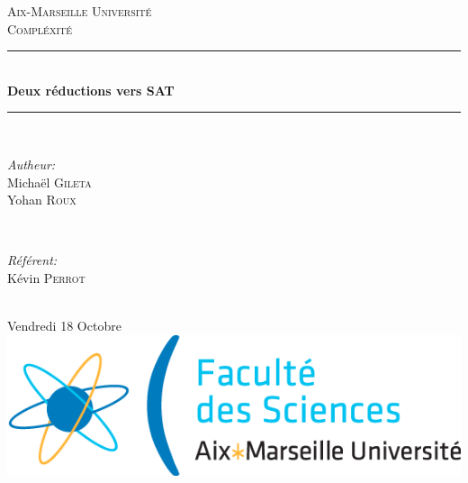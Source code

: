 \documentclass[12pt]{report}
\begin{document}
\begin{titlepage}
\vspace*{\fill}
\newcommand{\HRule}{\rule{\linewidth}{0.5mm}}

\center

\textsc{\LARGE Aix-Marseille Université}\\[1.5cm]
\textsc{\Large Compléxité}\\[0.5cm]

\HRule \\[0.4cm]
{ \huge \bfseries Deux réductions vers SAT}\\[0.4cm] %
\HRule \\[1.5cm]

\begin{minipage}{0.4\textwidth}
\begin{flushleft} \large
\emph{Autheur:}\\
Michaël \textsc{Gileta} \\
Yohan \textsc{Roux}
\end{flushleft}
\end{minipage}
~
\begin{minipage}{0.4\textwidth}
\begin{flushright} \large
\emph{Référent:} \\
Kévin \textsc{Perrot}
\end{flushright}
\end{minipage}\\[2cm]

{\large Vendredi 18 Octobre}\\[2cm]

\includegraphics[scale=0.5]{./images/logo.png}\\[1cm]

\vspace*{\fill}
\end{titlepage}

\end{document}
